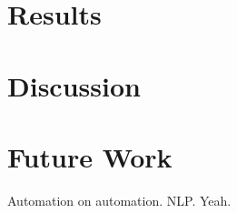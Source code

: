 \documentclass{sigchi}
\begin{document}
\section{Results}

\section{Discussion}

\section{Future Work}

Automation on automation. NLP. Yeah.



\end{document}
